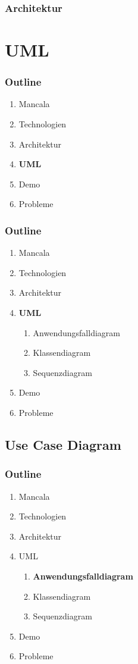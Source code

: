 \documentclass[
	10pt,
	t		%
]{beamer}
\begin{document}
\begin{frame}
\frametitle{Architektur}

\end{frame}

\section{UML}
\begin{frame}
\frametitle{Outline}
\begin{enumerate}
\item Mancala
\item Technologien
\item Architektur
\item \textbf{UML}
\item Demo
\item Probleme
\end{enumerate}
\end{frame}

\begin{frame}
\frametitle{Outline}
\begin{enumerate}
\item Mancala
\item Technologien
\item Architektur
\item \textbf{UML}
\begin{enumerate}
\item Anwendungsfalldiagram
\item Klassendiagram
\item Sequenzdiagram
\end{enumerate}
\item Demo
\item Probleme
\end{enumerate}
\end{frame}

\subsection{Use Case Diagram}
\begin{frame}
\frametitle{Outline}
\begin{enumerate}
\item Mancala
\item Technologien
\item Architektur
\item UML
\begin{enumerate}
\item \textbf{Anwendungsfalldiagram}
\item Klassendiagram
\item Sequenzdiagram
\end{enumerate}
\item Demo
\item Probleme
\end{enumerate}
\end{frame}
\end{document}
